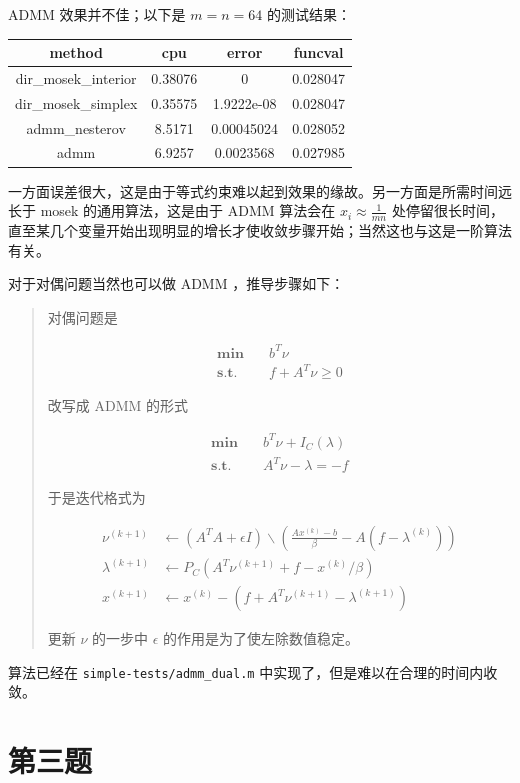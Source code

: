 \documentclass[]{article}
\begin{document}
ADMM 效果并不佳；以下是 \(m=n=64\) 的测试结果：

\begin{longtable}[]{@{}c|ccc@{}}
\hline
method & cpu & error & funcval\tabularnewline
\hline
dir\_mosek\_interior & 0.38076 & 0 & 0.028047\tabularnewline
dir\_mosek\_simplex & 0.35575 & 1.9222e-08 & 0.028047\tabularnewline
admm\_nesterov & 8.5171 & 0.00045024 & 0.028052\tabularnewline
admm & 6.9257 & 0.0023568 & 0.027985\tabularnewline
\hline
\end{longtable}

一方面误差很大，这是由于等式约束难以起到效果的缘故。另一方面是所需时间远长于
mosek 的通用算法，这是由于 ADMM 算法会在 \(x_i \approx \frac{1}{mn}\)
处停留很长时间，直至某几个变量开始出现明显的增长才使收敛步骤开始；当然这也与这是一阶算法有关。

对于对偶问题当然也可以做 ADMM ，推导步骤如下：

\begin{quote}
对偶问题是

\begin{align}
\textbf{min} \quad & b^T \nu\\
\textbf{s.t.} \quad & f+A^T\nu \ge 0
\end{align}

改写成 ADMM 的形式

\begin{align}
\textbf{min} \quad & b^T \nu + I_C(\lambda)\\
\textbf{s.t.} \quad & A^T\nu - \lambda = -f
\end{align}

于是迭代格式为

\begin{align}
\nu^{(k+1)} &\leftarrow (A^TA+\epsilon I) \backslash \left(\frac{Ax^{(k)}-b}{\beta}-A(f-\lambda^{(k)})\right) \\
\lambda^{(k+1)} &\leftarrow P_C(A^T \nu^{(k+1)} +f - x^{(k)} /\beta) \\
x^{(k+1)} &\leftarrow x^{(k)} - (f + A^T \nu^{(k+1)}-\lambda^{(k+1)})
\end{align}

更新 \(\nu\) 的一步中 \(\epsilon\) 的作用是为了使左除数值稳定。
\end{quote}

算法已经在 \texttt{simple-tests/admm\_dual.m}
中实现了，但是难以在合理的时间内收敛。

\part{第三题}
\end{document}

